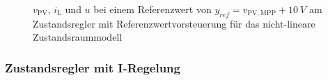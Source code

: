 \begin{figure}[H]
    \centering
    \caption[Validierung Regler mit Vorsteuerung (nicht-linear)]{$v_{\mathrm{PV}}$, $i_{\mathrm{L}}$ und $u$ bei einem Referenzwert von $y_{ref} = v_{\mathrm{PV,MPP}} + \SI{10}{V}$ am Zustandsregler mit Referenzwertvorsteuerung für das nicht-lineare Zustandsraummodell}
    \label{fig:Bild23}
\end{figure}

\subsubsection{Zustandsregler mit I-Regelung}


